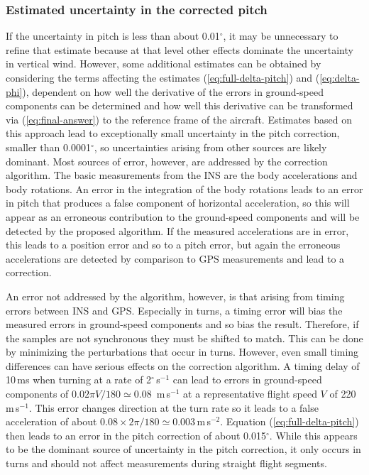 \documentclass[english,british,amtd,bookmarks=false,unicode=true]{copernicus}\usepackage[]{graphicx}\usepackage[]{color}
\begin{document}
\subsubsection{Estimated uncertainty in the corrected pitch}

If the uncertainty in pitch is less than about 0.01$^{\circ}$, it
may be unnecessary to refine that estimate because at that level other
effects dominate the uncertainty in vertical wind. However, some additional
estimates can be obtained by considering the terms affecting the estimates
(\ref{eq:full-delta-pitch}) and (\ref{eq:delta-phi}), dependent
on how well the derivative of the errors in ground-speed components
can be determined and how well this derivative can be transformed
via (\ref{eq:final-answer}) to the reference frame of the aircraft.
Estimates based on this approach lead to exceptionally small uncertainty
in the pitch correction, smaller than 0.0001$^{\circ}$, so uncertainties
arising from other sources are likely dominant. Most sources of error,
however, are addressed by the correction algorithm. The basic measurements
from the INS are the body accelerations and body rotations. An error
in the integration of the body rotations leads to an error in pitch
that produces a false component of horizontal acceleration, so this
will appear as an erroneous contribution to the ground-speed components
and will be detected by the proposed algorithm. If the measured accelerations
are in error, this leads to a position error and so to a pitch error,
but again the erroneous accelerations are detected by comparison to
GPS measurements and lead to a correction. 

An error not addressed by the algorithm, however, is that arising
from timing errors between INS and GPS. Especially in turns, a timing
error will bias the measured errors in ground-speed components and
so bias the result. Therefore, if the samples are not synchronous
they must be shifted to match. This can be done by minimizing the
perturbations that occur in turns. However, even small timing differences
can have serious effects on the correction algorithm. A timing delay
of 10\,ms when turning at a rate of 2$^{\circ}$\,s$^{-1}$ can
lead to errors in ground-speed components of $0.02\pi V/180\simeq$0.08~m\,s$^{-1}$
at a representative flight speed $V$ of 220\,m\,s$^{-1}$. This
error changes direction at the turn rate so it leads to a false acceleration
of about $0.08\times2\pi/180\simeq0.003$\,m\,s$^{-2}$. Equation
(\ref{eq:full-delta-pitch}) then leads to an error in the pitch correction
of about 0.015$^{\circ}$. While this appears to be the dominant source
of uncertainty in the pitch correction, it only occurs in turns and
should not affect measurements during straight flight segments. 
\end{document}
